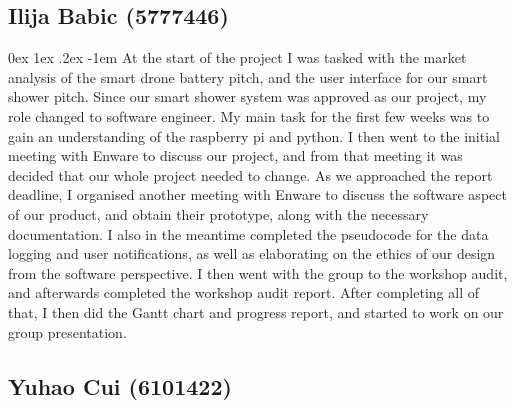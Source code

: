 \documentclass[12pt, a4paper]{article}
\makeatletter
\renewcommand\paragraph{\@startsection{paragraph}{5}{\parindent}%
  {0ex \@plus1ex \@minus.2ex}%
  {-1em}%
  {\normalfont\normalsize\bfseries}}
\makeatother
\begin{document}
            \subsection{Ilija Babic (5777446)}
                \paragraph{}
                    At the start of the project I was tasked with the market analysis of the smart drone battery pitch, and the user interface for our smart shower 
                    pitch. Since our smart shower system was approved as our project, my role changed to software engineer. My main task for the first few weeks was 
                    to gain an understanding of the raspberry pi and python. I then went to the initial meeting with Enware to discuss our project, and from that 
                    meeting it was decided that our whole project needed to change. As we approached the report deadline, I organised another meeting with Enware to 
                    discuss the software aspect of our product, and obtain their prototype, along with the necessary documentation. I also in the meantime completed 
                    the pseudocode for the data logging and user notifications, as well as elaborating on the ethics of our design from the software perspective. I 
                    then went with the group to the workshop audit, and afterwards completed the workshop audit report. After completing all of that, I then did the 
                    Gantt chart and progress report, and started to work on our group presentation.
            \subsection{Yuhao Cui (6101422)}
\end{document}
